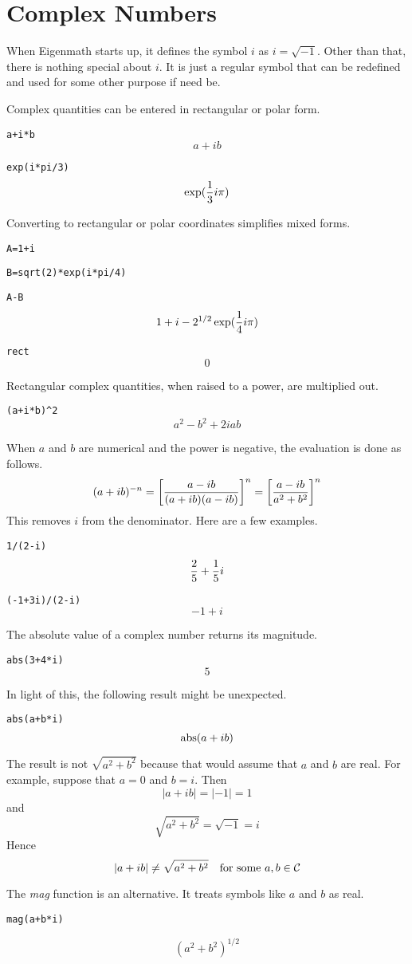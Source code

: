 \chapter{Complex Numbers}

\noindent
When Eigenmath starts up, it defines the symbol $i$ as $i=\sqrt{-1}$.
Other than that, there is nothing special about $i$.
It is just a regular symbol that can be redefined and used for some other purpose if need be.

\medskip
\noindent
Complex quantities can be entered in rectangular or polar form.

\medskip
\verb$a+i*b$
$$a+ib$$

\verb$exp(i*pi/3)$
$$\exp({1\over3}i\pi)$$

\medskip
\noindent
Converting to rectangular or polar coordinates simplifies mixed forms.

\medskip
\verb$A=1+i$

\verb$B=sqrt(2)*exp(i*pi/4)$

\verb$A-B$
$$1+i-2^{1/2}\exp({1\over4}i\pi)$$

\verb$rect$
$$0$$

\newpage

\noindent
Rectangular complex quantities, when raised to a power, are multiplied out.

\medskip
\verb$(a+i*b)^2$
$$a^2-b^2+2iab$$

\medskip
\noindent
When $a$ and $b$ are numerical and the power is negative, the evaluation is done as follows.
$$(a+ib)^{-n}=\left[{a-ib\over(a+ib)(a-ib)}\right]^n=\left[{a-ib\over a^2+b^2}\right]^n$$
This removes $i$ from the denominator.
Here are a few examples.

\medskip
\verb$1/(2-i)$
$${2\over5}+{1\over5}i$$

\verb$(-1+3i)/(2-i)$
$$-1+i$$

\newpage

\noindent
The absolute value of a complex number returns its magnitude.

\medskip
\verb$abs(3+4*i)$
$$5$$

\medskip
\noindent
In light of this, the following result might be unexpected.

\medskip
\verb$abs(a+b*i)$
$$\mathop{\rm abs}(a+ib)$$

\medskip
\noindent
The result is not $\sqrt{a^2+b^2}$ because that would assume that
$a$ and $b$ are real.
For example, suppose that $a=0$ and $b=i$.
Then
$$|a+ib|=|-1|=1$$
and
$$\sqrt{a^2+b^2}=\sqrt{-1}=i$$
Hence
$$|a+ib|\ne\sqrt{a^2+b^2}\quad\hbox{for some $a,b\in\cal C$}$$

\medskip
\noindent
The {\it mag} function is an alternative.
It treats symbols like $a$ and $b$ as real.

\medskip
\verb$mag(a+b*i)$

$$(a^2+b^2)^{1/2}$$


